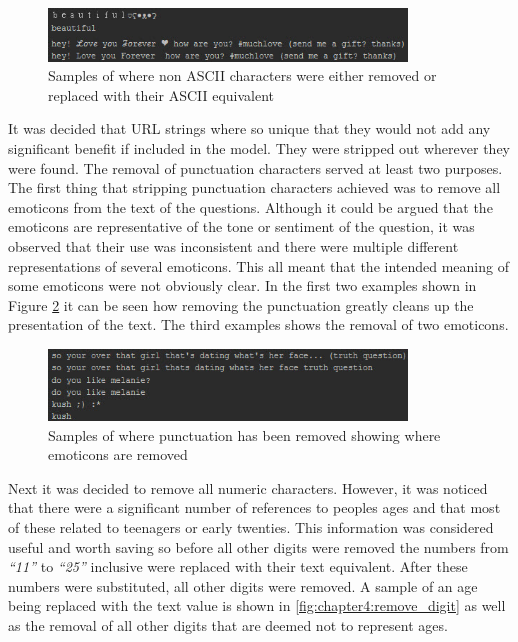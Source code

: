\begin{figure}[htbp]
	\centering
	\includegraphics[width=0.85\textwidth]{Figures/Chapter4/remove_nonascii_01.jpg}
	\caption[Remove non ASCII characters]{Samples of where non ASCII characters were either removed or replaced with their ASCII equivalent}
	\label{fig:chapter4:remove_nonascii}
\end{figure}

It was decided that URL strings where so unique that they would not add any significant benefit if included in the model. They were stripped out wherever they were found. The removal of punctuation characters served at least two purposes. The first thing that stripping punctuation characters achieved was to remove all emoticons from the text of the questions. Although it could be argued that the emoticons are representative of the tone or sentiment of the question, it was observed that their use was inconsistent and there were multiple different representations of several emoticons. This all meant that the intended meaning of some emoticons were not obviously clear. In the first two examples shown in Figure \ref{fig:chapter4:remove_punct} it can be seen how removing the punctuation greatly cleans up the presentation of the text. The third examples shows the removal of two emoticons.

\begin{figure}[htbp]
	\centering
	\includegraphics[width=0.85\textwidth]{Figures/Chapter4/remove_punct_01.jpg}
	\caption[Remove punctuation characters]{Samples of where punctuation has been removed showing where emoticons are removed}
	\label{fig:chapter4:remove_punct}
\end{figure}

Next it was decided to remove all numeric characters. However, it was noticed that there were a significant number of references to peoples ages and that most of these related to teenagers or early twenties. This information was considered useful and worth saving so before all other digits were removed the numbers from \textit{``11''} to \textit{``25''} inclusive were replaced with their text equivalent. After these numbers were substituted, all other digits were removed. A sample of an age being replaced with the text value is shown in \ref{fig:chapter4:remove_digit} as well as the removal of all other digits that are deemed not to represent ages.

